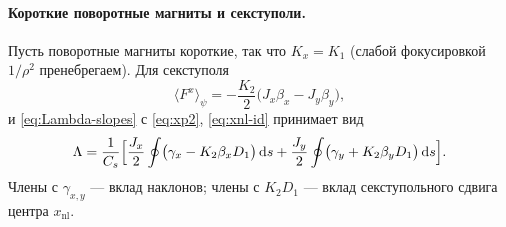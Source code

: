 \paragraph{Короткие поворотные магниты и секступоли.}
Пусть поворотные магниты короткие, так что $K_x=K_1$ (слабой фокусировкой $1/\rho^2$ пренебрегаем). Для секступоля
\begin{equation}
\label{eq:Favg}
\langle F^x\rangle_\psi
=-\frac{K_2}{2}\bigl(J_x\beta_x-J_y\beta_y\bigr),
\end{equation}
и \eqref{eq:Lambda-slopes} с \eqref{eq:xp2}, \eqref{eq:xnl-id} принимает вид
\begin{equation}
\label{eq:Lambda-g}
\Lambda
=\frac{1}{C_s}\Bigl[
\frac{J_x}{2}\oint\bigl(\gamma_x-K_2\beta_x D_1\bigr)\,\mathrm{d}s
+\frac{J_y}{2}\oint\bigl(\gamma_y+K_2\beta_y D_1\bigr)\,\mathrm{d}s
\Bigr].
\end{equation}
Члены с $\gamma_{x,y}$ --- вклад наклонов; члены с $K_2D_1$ --- вклад секступольного сдвига центра $x_{\mathrm{nl}}$.

